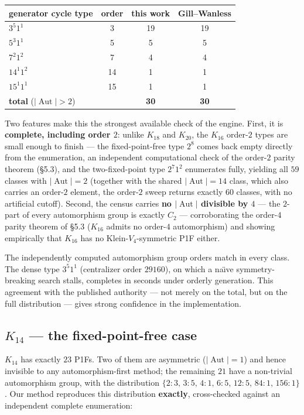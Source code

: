 \documentclass[11pt,reqno]{amsart}
\theoremstyle{plain}
\theoremstyle{definition}
\numberwithin{theorem}{section}
\newcommand{\Aut}{\operatorname{Aut}}
\begin{document}
\begin{center}
\begin{tabular}{lccc}
\toprule
generator cycle type & order & this work & Gill--Wanless \\
\midrule
$3^5 1^1$  & 3  & 19 & 19 \\
$5^3 1^1$  & 5  & 5  & 5  \\
$7^2 1^2$  & 7  & 4  & 4  \\
$14^1 1^2$ & 14 & 1  & 1  \\
$15^1 1^1$ & 15 & 1  & 1  \\
\midrule
\textbf{total} ($|\Aut|>2$) & & \textbf{30} & \textbf{30} \\
\bottomrule
\end{tabular}
\end{center}

Two features make this the strongest available check of the engine. First, it is
\textbf{complete, including order $2$}: unlike $K_{18}$ and $K_{20}$, the $K_{16}$ order-$2$
types are small enough to finish --- the fixed-point-free type $2^8$ comes back empty
directly from the enumeration, an independent computational check of the order-$2$
parity theorem (\S5.3), and the two-fixed-point type $2^7 1^2$ enumerates fully, yielding
all $59$ classes with $|\Aut|=2$ (together with the shared $|\Aut|=14$ class, which also
carries an order-$2$ element, the order-$2$ sweep returns exactly $60$ classes, with no
artificial cutoff). Second, the census carries
\textbf{no $|\Aut|$ divisible by $4$} --- the $2$-part of every automorphism group is
exactly $C_2$ --- corroborating the order-$4$ parity theorem of \S5.3 ($K_{16}$ admits no
order-$4$ automorphism) and showing empirically that $K_{16}$ has no Klein-$V_4$-symmetric
P1F either.

The independently computed automorphism group orders match in every class. The dense
type $3^5 1^1$ (centralizer order $29160$), on which a na\"{\i}ve symmetry-breaking search
stalls, completes in seconds under orderly generation. This agreement with the
published authority --- not merely on the total, but on the full distribution --- gives
strong confidence in the implementation.

\subsection{$K_{14}$ --- the fixed-point-free case}

$K_{14}$ has exactly $23$ P1Fs. Two of them are asymmetric ($|\Aut|=1$) and
hence invisible to any automorphism-first method; the remaining $21$ have a
non-trivial automorphism group, with the distribution
$\{2{:}3,\,3{:}5,\,4{:}1,\,6{:}5,\,12{:}5,\,84{:}1,\,156{:}1\}$. Our method reproduces
this distribution \textbf{exactly}, cross-checked against an independent complete
enumeration:
\end{document}
